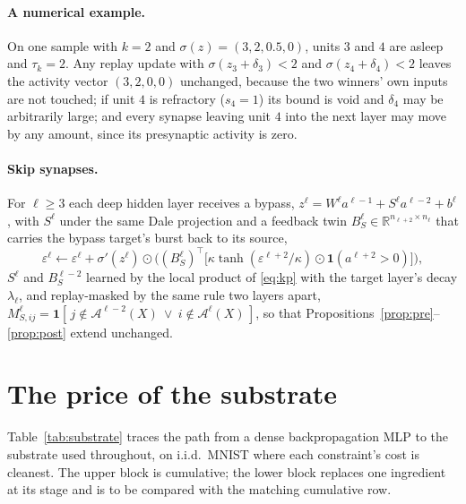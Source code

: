 \documentclass{article}
\begin{document}
\paragraph{A numerical example.} On one sample with $k=2$ and $\sigma(z)=(3,2,0.5,0)$, units
$3$ and $4$ are asleep and $\tau_k=2$. Any replay update with $\sigma(z_3+\delta_3)<2$ and
$\sigma(z_4+\delta_4)<2$ leaves the activity vector $(3,2,0,0)$ unchanged, because the two
winners' own inputs are not touched; if unit $4$ is refractory ($s_4=1$) its bound is void and
$\delta_4$ may be arbitrarily large; and every synapse leaving unit $4$ into the next layer may
move by any amount, since its presynaptic activity is zero.

\paragraph{Skip synapses.} For $\ell\ge3$ each deep hidden layer receives a bypass,
$z^\ell=W^\ell a^{\ell-1}+S^\ell a^{\ell-2}+b^\ell$, with $S^\ell$ under the same Dale
projection and a feedback twin $B_S^{\ell}\in\mathbb{R}^{n_{\ell+2}\times n_\ell}$ that carries the
bypass target's burst back to its source,
\[
\varepsilon^{\ell}\leftarrow\varepsilon^{\ell}+\sigma'(z^{\ell})\odot\Big((B_S^{\ell})^{\!\top}\big[\kappa\tanh(\varepsilon^{\ell+2}/\kappa)\odot\mathbf{1}(a^{\ell+2}>0)\big]\Big),
\]
$S^\ell$ and $B_S^{\ell-2}$ learned by the local product of \eqref{eq:kp} with the target
layer's decay $\lambda_\ell$, and replay-masked by the same rule two layers apart,
$M^{\ell}_{S,ij}=\mathbf{1}[\,j\notin\mathcal{A}^{\ell-2}(X)\ \lor\ i\notin\mathcal{A}^{\ell}(X)\,]$,
so that Propositions~\ref{prop:pre}--\ref{prop:post} extend unchanged.

\section{The price of the substrate}
\label{app:substrate}

Table~\ref{tab:substrate} traces the path from a dense backpropagation MLP to the substrate
used throughout, on i.i.d.\ MNIST where each constraint's cost is cleanest. The upper block is
cumulative; the lower block replaces one ingredient at its stage and is to be compared with
the matching cumulative row.
\end{document}
